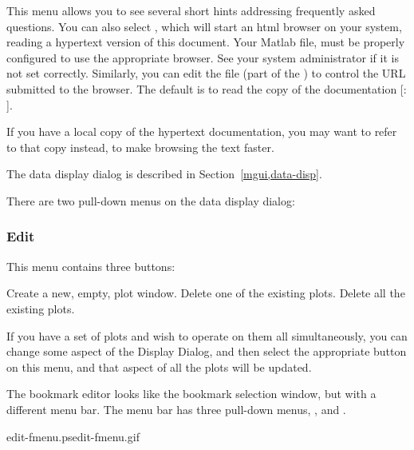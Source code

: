 
This menu allows you to see several short hints addressing frequently
asked questions. You can also select , which
will start an html browser on your system, reading a hypertext version
of this document. Your Matlab file,  must be properly
configured to use the appropriate browser. See your system
administrator if it is not set correctly. Similarly, you can edit the
 file (part of the \GUI) to control the URL submitted
to the browser. The default is to read the copy of the documentation
[: \lit{\footnotesize\DODSmguiUrl}]{\DODSmguiUrl}. 

If you have a local copy of the hypertext documentation, you may want
to refer to that copy instead, to make browsing the text faster.




The data display dialog is described in Section~\ref{mgui,data-disp}.


There are two pull-down menus on the data display dialog:

\subsubsection{Edit}

This menu contains three buttons:

\begin{description}
 Create a new, empty, plot window.
 Delete one of the existing plots.
 Delete all the existing plots.
\end{description}


If you have a set of plots and wish to operate on them all
simultaneously, you can change some aspect of the Display Dialog, and
then select the appropriate button on this menu, and that aspect of
all the plots will be updated.


The bookmark editor looks like the bookmark selection window, but with
a different menu bar.  The menu bar has three pull-down menus,
,  and .


%
{edit-fmenu.ps}{edit-fmenu.gif}{}

